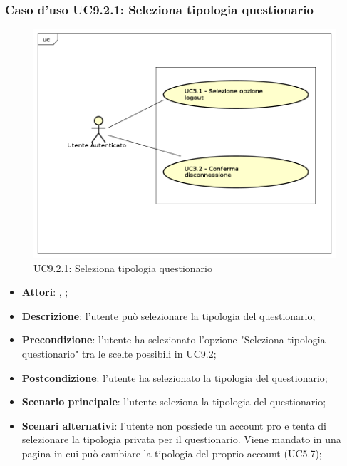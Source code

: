 		\subsubsection{Caso d'uso UC9.2.1: Seleziona tipologia questionario}
		\label{UC9.2.1}
		\begin{figure}[h]
			\centering
		\includegraphics[scale=0.5,keepaspectratio]{UML/UC9.png}
			\caption{UC9.2.1: Seleziona tipologia questionario}
		\end{figure}
		\FloatBarrier
		\begin{itemize}
			\item \textbf{Attori}: \uau, \uaupro;
			\item \textbf{Descrizione}: l'utente può selezionare la tipologia del questionario; 
			\item \textbf{Precondizione}: l'utente ha selezionato l'opzione "Seleziona tipologia questionario" tra le scelte possibili in UC9.2;
			\item \textbf{Postcondizione}: l'utente ha selezionato la tipologia del questionario;
			\item \textbf{Scenario principale}: l'utente seleziona la tipologia del questionario;
			\item \textbf{Scenari alternativi}: l'utente non possiede un account pro e tenta di selezionare la tipologia privata per il questionario. Viene mandato in una pagina in cui può cambiare la tipologia del proprio account (UC5.7); 
		\end{itemize}
			
